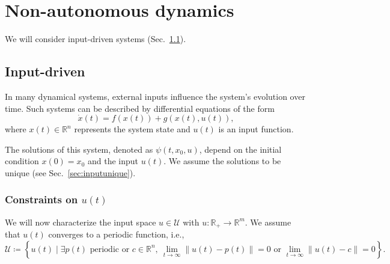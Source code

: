 \documentclass{article}
\theoremstyle{definition} \newtheorem{definition}{Definition}
\theoremstyle{remark} \newtheorem{remark}{Remark}
\newcommand{\reals}{\mathbb{R}}
\newcounter{ct}
\begin{document}





\section{Non-autonomous dynamics}\label{sec:nonautonomous}
We will consider input-driven systems (Sec.~\ref{sec:inputdriven}).  %


\subsection{Input-driven}\label{sec:inputdriven}
In many dynamical systems, external inputs influence the system's evolution over time. Such systems can be described by differential equations of the form
\begin{equation}\label{eq:inputdriven}
\dot x(t) = f(x(t)) + g(x(t),u(t)),
\end{equation}
where $x(t)\in\reals^n$  represents the system state and $u(t)$ is an input function.

The solutions of this system, denoted as $\psi(t,x_0,u)$, depend on the initial condition $x(0) = x_0$  and the input $u(t)$.
We assume the solutions to be unique (see Sec.~\ref{sec:inputunique}).


\subsubsection{Constraints on $u(t)$}
We will now characterize the input space 
$u\in \mathcal{U}$ with $u:\reals_+\rightarrow\reals^m$.
We assume that $u(t)$ converges to a periodic function, i.e., %
\begin{equation}
\mathcal{U} \coloneqq \left\{ u(t) \mid \exists p(t) \text{ periodic} \text{ or } c \in \mathbb{R}^n, \ \lim_{t \to \infty} \| u(t) - p(t) \| = 0 \text{ or } \lim_{t \to \infty} \| u(t) - c \| = 0 \right\}.
\end{equation}


\end{document}
